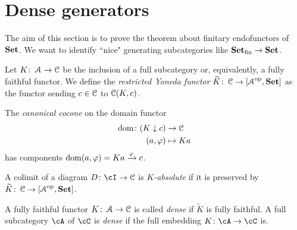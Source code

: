 \documentclass[a4paper,11pt,oneside,openany]{scrbook}
\begin{document}
\section{Dense generators}

The aim of this section is to prove the theorem about finitary endofunctors of
${\normalfont\textbf{Set}}$. We want to identify ``nice" generating subcategories like
${\normalfont\textbf{Set}}_\text{fin}\to{\normalfont\textbf{Set}}$.
\begin{defn}
	Let $K\colon\operatorname{\mathcal{A}}\to\operatorname{\mathcal{C}}$ be the inclusion of a full subcategory or,
    equivalently, a fully faithful functor. We define the \emph{restricted
    Yoneda functor} $\widetilde{K}\colon\operatorname{\mathcal{C}}\to\left[\operatorname{\mathcal{A}}^{\operatorname{\text{op}}},{\normalfont\textbf{Set}}\right]$ as the
    functor sending $c\in\operatorname{\mathcal{C}}$ to $\operatorname{\mathcal{C}}(K,c)$.
\end{defn}
The \emph{canonical cocone} on the domain functor
\begin{align*}
	\operatorname{dom}\colon(K\downarrow c) & \to\operatorname{\mathcal{C}}      \\
	(a,\varphi)               & \mapsto Ka
\end{align*}
has components $\operatorname{dom}(a,\varphi)=Ka\xrightarrow{\varphi}c$.
\begin{defn}
	A colimit of a diagram $D\colon\cI\to\C$ is \emph{$K$-absolute} if it is
    preserved by $\widetilde{K}\colon\operatorname{\mathcal{C}}\to\left[\operatorname{\mathcal{A}}^{\operatorname{\text{op}}},{\normalfont\textbf{Set}}\right]$.
\end{defn}
\begin{defn}
	A fully faithful functor $K\colon\operatorname{\mathcal{A}}\to\operatorname{\mathcal{C}}$ is called \emph{dense} if
    $\widetilde{K}$ is fully faithful. A full subcategory $\cA$ of $\cC$ is
    \emph{dense} if the full embedding $K\colon\cA\rightarrow\cC$ is.
\end{defn}
\end{document}
